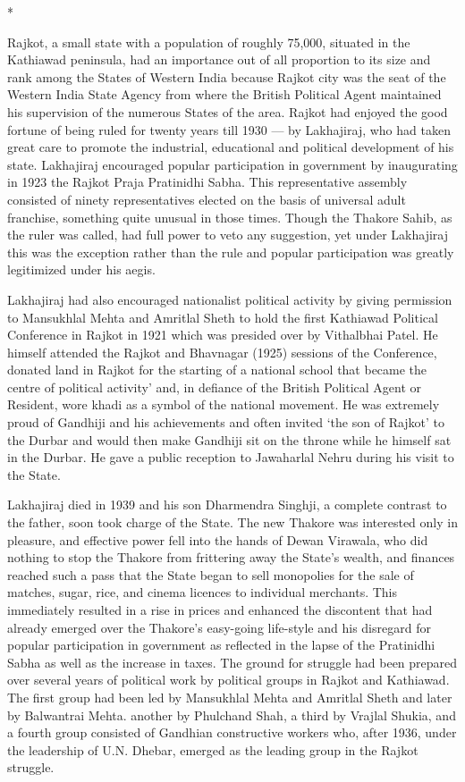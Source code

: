 \begin{center}*\end{center}



Rajkot, a small state with a population of roughly 75,000, situated in the Kathiawad peninsula, had an importance out of all proportion to its size and rank among the States of Western India because Rajkot city was the seat of the Western India State Agency from where the British Political Agent maintained his supervision of the numerous States of the area. Rajkot had enjoyed the good fortune of being ruled for twenty years till 1930 — by Lakhajiraj, who had taken great care to promote the industrial, educational and political development of his state. Lakhajiraj encouraged popular participation in government by inaugurating in 1923 the Rajkot Praja Pratinidhi Sabha. This representative assembly consisted of ninety representatives elected on the basis of universal adult franchise, something quite unusual in those times. Though the Thakore Sahib, as the ruler was called, had full power to veto any suggestion, yet under Lakhajiraj this was the exception rather than the rule and popular participation was greatly legitimized under his aegis. 

Lakhajiraj had also encouraged nationalist political activity by giving permission to Mansukhlal Mehta and Amritlal Sheth to hold the first Kathiawad Political Conference in Rajkot in 1921 which was presided over by Vithalbhai Patel. He himself attended the Rajkot and Bhavnagar (1925) sessions of the Conference, donated land in Rajkot for the starting of a national school that became the centre of political activity’ and, in defiance of the British Political Agent or Resident, wore khadi as a symbol of the national movement. He was extremely proud of Gandhiji and his achievements and often invited ‘the son of Rajkot’ to the Durbar and would then make Gandhiji sit on the throne while he himself sat in the Durbar. He gave a public reception to Jawaharlal Nehru during his visit to the State. 

Lakhajiraj died in 1939 and his son Dharmendra Singhji, a complete contrast to the father, soon took charge of the State. The new Thakore was interested only in pleasure, and effective power fell into the hands of Dewan Virawala, who did nothing to stop the Thakore from frittering away the State’s wealth, and finances reached such a pass that the State began to sell monopolies for the sale of matches, sugar, rice, and cinema licences to individual merchants. This immediately resulted in a rise in prices and enhanced the discontent that had already emerged over the Thakore’s easy-going life-style and his disregard for popular participation in government as reflected in the lapse of the Pratinidhi Sabha as well as the increase in taxes. The ground for struggle had been prepared over several years of political work by political groups in Rajkot and Kathiawad. The first group had been led by Mansukhlal Mehta and Amritlal Sheth and later by Balwantrai Mehta. another by Phulchand Shah, a third by Vrajlal Shukia, and a fourth group consisted of Gandhian constructive workers who, after 1936, under the leadership of U.N. Dhebar, emerged as the leading group in the Rajkot struggle. 

